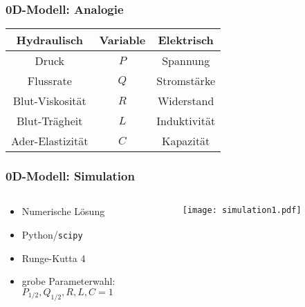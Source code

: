 \begin{frame}
\frametitle{0D-Modell: Analogie}
  \begin{center}
  	\begin{tabular}[!htb]{c c c}
  		Hydraulisch	&	Variable	&	Elektrisch\\
  		\hline
  		Druck	&	$P$	&	Spannung\\
  		Flussrate	&	$Q$	&	Stromstärke\\
  		Blut-Viskosität	&	$R$	&	Widerstand\\
  		Blut-Trägheit	&	$L$	&	Induktivität\\
  		Ader-Elastizität	&	$C$	&	Kapazität
  	\end{tabular}
  \end{center}

\end{frame}


\begin{frame}
\frametitle{0D-Modell: Simulation}
\begin{columns}
  \begin{column}{0.45\textwidth}
    \begin{itemize}
      \item Numerische Lösung\\
      \item Python/\texttt{scipy}\\
      \item Runge-Kutta 4\\
      \item grobe Parameterwahl:\\
      {$P_{1/2}, Q_{1/2}, R, L, C = 1$}
    \end{itemize}
  \end{column}
  \begin{column}{0.55\textwidth}
    \begin{center}
      \centering
      \texttt{[image: simulation1.pdf]}\\
    \end{center}
  \end{column}
\end{columns}


\end{frame}
